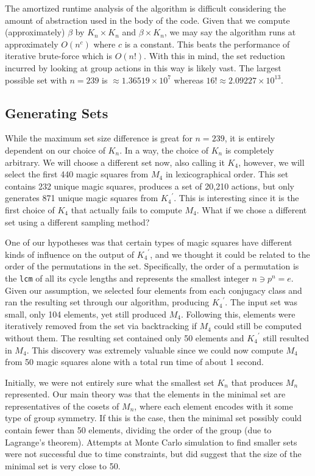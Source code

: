 \documentclass{rhumj_new}
\begin{document}
The amortized runtime analysis of the algorithm is difficult considering the amount of
abstraction used in the body of the code. Given that we compute (approximately) $\beta$ by $K_n
  \times K_n$ and $\beta \times K_n$, we may say the algorithm runs at approximately
$O\left(n^c\right)$ where $c$ is a constant. This beats the performance of iterative brute-force
which is
$O\left(n!\right)$. With this in mind, the set reduction incurred by looking at group actions in
this way is likely vast. The largest possible set with $n=239$ is $\approx 1.36519 \times 10^7$
whereas $16!\approx 2.09227 \times 10^{13}$.

\subsection{Generating Sets}

While the maximum set size difference is great for $n=239$, it is entirely dependent on our
choice of $K_n$. In a way, the choice of $K_n$ is completely arbitrary. We will choose a different
set now, also calling it $K_4$, however, we will select the first 440 magic squares from $M_4$ in
lexicographical order. This set contains 232 unique magic squares, produces a set of 20,210
actions, but only generates 871 unique magic squares from ${K_4}^\prime$. This is interesting since
it
is the first choice of $K_4$ that actually fails to compute $M_4$. What if we chose a different set
using a different sampling method?

One of our hypotheses was that certain types of magic squares have different kinds of
influence on the output of ${K_4}^\prime$, and we thought it could be related to the order of the
permutations in the set. Specifically, the order of a permutation is the \texttt{lcm} of all its
cycle lengths and represents the smallest integer $n \ni p^n = e$. Given our assumption, we
selected four elements from each conjugacy class and ran the resulting set through our algorithm,
producing ${K_4}^\prime$. The input set was small, only 104 elements, yet still produced $M_4$.
Following this, elements were iteratively removed from the set via backtracking if $M_4$ could
still be computed without them. The resulting set contained only 50 elements and ${K_4}^\prime$
still resulted in $M_4$. This discovery was extremely valuable since we could now compute $M_4$
from 50 magic squares alone with a total run time of about 1 second.

Initially, we were not entirely sure what the smallest set $K_n$ that produces $M_n$
represented. Our main theory was that the elements in the minimal set are
representatives of the cosets of $M_n$, where each element encodes with it some type of group
symmetry. If this is the case, then the minimal set possibly could contain fewer than 50 elements,
dividing the order of the group (due to Lagrange's theorem). Attempts at Monte Carlo simulation to
find smaller sets were not successful due to time constraints, but did suggest that the size of the
minimal set is very close to 50.
\end{document}
